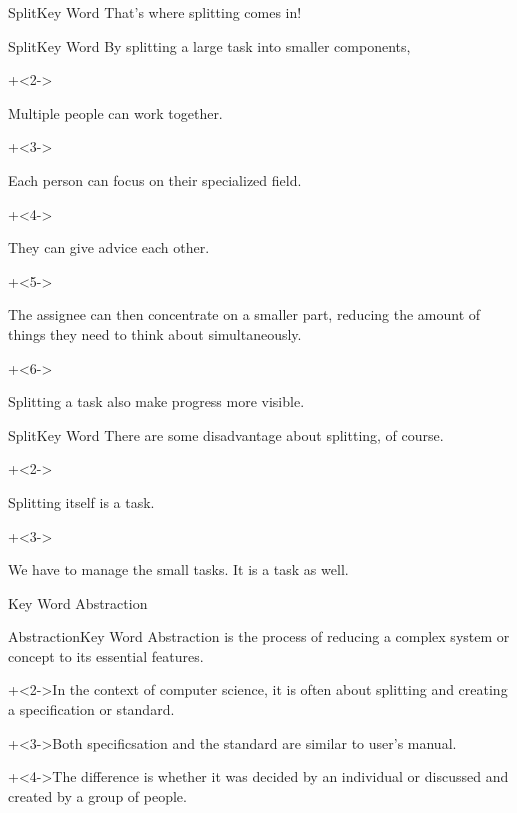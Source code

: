 \begin{frame}{Split}{Key Word}
    {\Large That's where splitting comes in!}
\end{frame}


\begin{frame}{Split}{Key Word}
    By splitting a large task into smaller components,
    \vspace{4ex}

    \begin{itemize}
        \onslide+<2->{\item Multiple people can work together.
            \begin{itemize}
                \onslide+<3->{\item Each person can focus on their specialized field.}
                \onslide+<4->{\item They can give advice each other.}
            \end{itemize}}
        \onslide+<5->{\item The assignee can then concentrate on a smaller part, reducing the amount of things they need to think about simultaneously.}
        \onslide+<6->{\item Splitting a task also make progress more visible.}
    \end{itemize}
\end{frame}


\begin{frame}{Split}{Key Word}
    There are some disadvantage about splitting, of course.
    \vspace{4ex}

    \begin{itemize}
        \onslide+<2->{\item Splitting itself is a task.}
        \onslide+<3->{\item We have to manage the small tasks. It is a task as well.}
    \end{itemize}
\end{frame}


\begin{frame}{Key Word}{}
    {\Huge Abstraction}
\end{frame}


\begin{frame}{Abstraction}{Key Word}
    Abstraction is the process of reducing a complex system or concept to its essential features.
    \vspace{4ex}

    \onslide+<2->{In the context of computer science, it is often about splitting and creating a specification or standard.}
    \vspace{2ex}

    \onslide+<3->{Both specificsation and the standard are similar to user's manual.}
    \vspace{2ex}

    \onslide+<4->{The difference is whether it was decided by an individual or discussed and created by a group of people.}
\end{frame}


